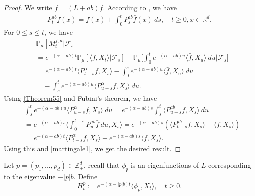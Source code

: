 \documentclass[12pt,a4paper]{amsart}
\theoremstyle{plain}
\theoremstyle{definition}
\numberwithin{equation}{section}
\begin{document}
\begin{proof}
    We write $\bar{f}=(L+ab)f$. According to \cite[Theorem A.55]{Li2011Measure-valued}, we have
\begin{equation}\begin{split}\label{Theorem55}
    P_t^{ab}f(x)= f(x)+\int_0^t P_s^{ab}\bar{f}(x)~ds,\quad t\geq 0,x\in \mathbb R^d.
\end{split}\end{equation}
For $0\leq s\leq t$, we have
\begin{equation}\begin{split}
\label{martingale1}
    &\mathbb{P}_{\mu}[M_t^{f,a}|\mathscr{F}_s]
    \\&=e^{-(\alpha-ab)t}\mathbb{P}_{\mu}\left[\langle f,X_t\rangle|\mathscr{F}_s\right]-\mathbb{P}_{\mu}\Big[\int_0^t e^{-(\alpha-ab)u}\langle \bar{f}, X_u\rangle~ du\Big|\mathscr{F}_s\big]
    \\&=e^{-(\alpha-ab)t}\langle P_{t-s}^{\alpha}f, X_s\rangle-\int_0^s e^{-(\alpha-ab)u}\langle \bar{f}, X_u\rangle~ du
    \\&\quad -\int_s^t e^{-(\alpha-ab)u}\langle P_{u-s}^{\alpha} \bar{f},X_s\rangle~ du.
\end{split}\end{equation}
    Using \eqref{Theorem55} and Fubini's theorem, we have
\begin{equation}\begin{split}
    &\int_s^t e^{-(\alpha-ab)u}\langle P_{u-s}^{\alpha} \bar{f},X_s\rangle~ du=e^{-(\alpha-ab)s}\int_s^t\langle P_{u-s}^{ab}\bar{f},X_s\rangle~du\\
    &=e^{-(\alpha-ab)s}\Big\langle\int_0^{t-s}P_{u}^{ab}\bar{f}~du,X_s\Big\rangle=e^{-(\alpha-ab)s}\left(\langle P_{t-s}^{ab}f,X_s\rangle-\langle
    f,X_s\rangle\right)\\
    &=e^{-(\alpha-ab)t}\langle P_{t-s}^{\alpha}f, X_s\rangle-e^{-(\alpha-ab)s}\langle
    f,X_s\rangle.
\end{split}\end{equation}
   Using this and \eqref{martingale1}, we get the desired result.
\end{proof}

    Let $p=(p_1,...,p_d)\in \mathbb Z_+^d$, recall that $\phi_p$ is an eigenfunctions of $L$ corresponding to the eigenvalue $-|p|b$. Define
\[
    H_t^p
    :=e^{-(\alpha-|p|b)t}\langle\phi_p,X_t\rangle, \quad t\geq 0.
\]
\end{document}
